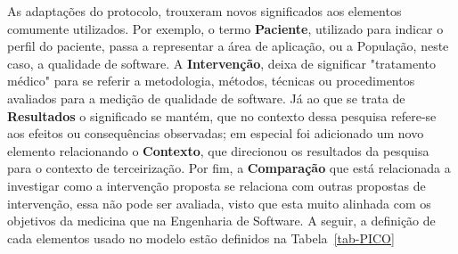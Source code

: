 As adaptações do protocolo, trouxeram novos significados aos elementos comumente utilizados. Por exemplo, o termo \textbf{Paciente}, utilizado para indicar o perfil do paciente, passa a representar a área de aplicação, ou a População, neste caso, a qualidade de software. A \textbf{Intervenção}, deixa de significar "tratamento médico" para se referir a metodologia, métodos, técnicas ou procedimentos avaliados para a medição de qualidade de software. Já ao que se trata de \textbf{Resultados} o significado se mantém, que no contexto dessa pesquisa refere-se aos efeitos ou consequências observadas; em especial foi adicionado um novo elemento relacionando o \textbf{Contexto}, que direcionou os resultados da pesquisa para o contexto de terceirização. Por fim, a \textbf{Comparação} que está relacionada a investigar como a intervenção proposta se relaciona com outras propostas de intervenção, essa não pode ser avaliada, visto que esta muito alinhada com os objetivos da medicina que na Engenharia de Software. A seguir, a definição de cada elementos usado no modelo estão definidos na Tabela~\ref{tab-PICO}


